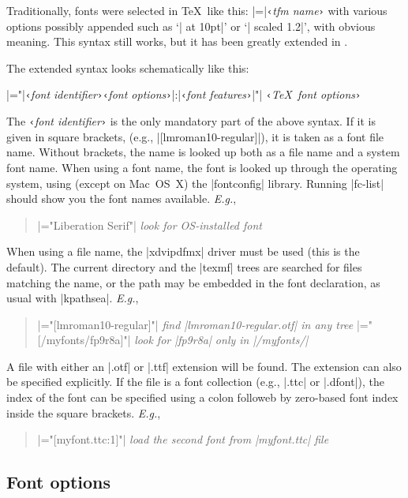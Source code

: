 \documentclass[12pt]{article}
\newcommand\xarg[1]{\texttt‹{\rmfamily\itshape #1}\texttt›}
\let\latin\textit
\def\Eg{\latin{E.g.}}
\begin{document}
Traditionally, fonts were selected in \TeX\ like this:
|\font\1=|\xarg{tfm name} with various options possibly appended
such as `| at 10pt|' or `| scaled 1.2|', with obvious meaning. This syntax
still works, but it has been greatly extended in \XeTeX.

The extended syntax looks schematically like this:

{\centering
 |\font\1="|\xarg{font identifier}\xarg{font options}|:|\xarg{font features}|"|
 \xarg{\TeX\ font options}\par}

\noindent The \xarg{font identifier} is the only mandatory part of the
above syntax.  If it is given in square brackets, (e.g.,
|[lmroman10-regular]|), it is taken as a font file name.
Without brackets, the name is looked up both as a file name and a system
font name.
When using a font name, the font is looked up through the operating
system, using (except on Mac~OS~X) the |fontconfig| library.  Running
|fc-list| should show you the font names available.  \Eg,
\begin{quote}\small
|\font\1="Liberation Serif"| \hfill \emph{look for OS-installed font}
\end{quote}

When using a file name, the |xdvipdfmx| driver must be used (this is the
default). The current directory and the |texmf| trees are searched for
files matching the name, or the path may be embedded in the font
declaration, as usual with |kpathsea|. \Eg,
\begin{quote}\small
|\font\2="[lmroman10-regular]"| \hfill
  {\em find |lmroman10-regular.otf| in any tree}
|\font\3="[/myfonts/fp9r8a]"| \hfill
  {\em look for |fp9r8a| only in |/myfonts/|}
\end{quote}

A file with either an |.otf| or |.ttf| extension will be found.  The
extension can also be specified explicitly.
If the file is a font collection (e.g., |.ttc| or |.dfont|), the index of the
font can be specified using a colon followeb by zero-based font index inside
the square brackets. \Eg,
\begin{quote}\small
|\font\4="[myfont.ttc:1]"| \hfill {\em load the second font from |myfont.ttc| file}
\end{quote}


\subsection{Font options}
\end{document}
